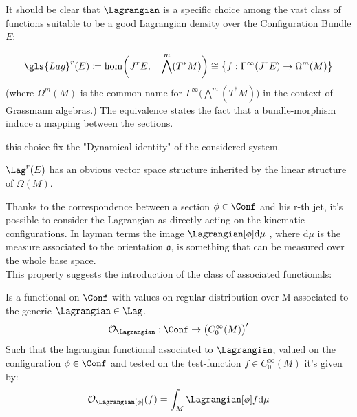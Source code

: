 \documentclass[Main]{subfiles}
\begin{document}
	It should be clear that $\Lagrangian$ is a specific choice among the vast class of functions suitable to be a good Lagrangian density over the  Configuration Bundle $E$:
	\begin{definition}
		\begin{displaymath}
			\gls{Lag}^r (E) \coloneqq \hom\biggr(J^r E,\quad \bigwedge^m( T^*M)\biggr)  \cong \big\{f:\Gamma^\infty(J^r E) \rightarrow \Omega^m(M)  \big\}
		\end{displaymath}
	(where $\Omega^m(M)$ is the common name for $\Gamma^\infty \big( \bigwedge^m( T^*M) \big)$ in the context of Grassmann algebras.)
	The equivalence states the fact that a bundle-morphism induce a mapping between the sections.
	\end{definition}
	 this choice fix the "Dynamical identity" of the considered system.
	\begin{proposition}
		$\Lag^r(E)$ has an obvious vector space structure inherited by the linear structure of $\Omega(M)$.
	\end{proposition}
	
	
	Thanks to the correspondence between a section $\phi \in \Conf$ and his r-th jet, it's possible to consider the Lagrangian as directly acting on the kinematic configurations.
	In layman terms the image  $\Lagrangian [ \phi ] \textrm{d}\mu$ , where $\textrm{d}\mu$ is the measure associated to the orientation $\mathfrak{o}$, is something that can be measured over the whole base space. 
	\\
	This property suggests the introduction of the class of associated functionals:
	\begin{definition}
		Is a functional on $\Conf$ with values on regular distribution over M associated to the generic $\Lagrangian \in \Lag$.	
		\begin{displaymath}
			\mathcal{O}_\Lagrangian : \Conf \rightarrow \big( C^\infty_0(M) \big)'
		\end{displaymath}			
			Such that the lagrangian functional associated to $\Lagrangian$, valued on the configuration $\phi \in \Conf$ and tested on the test-function $f \in C^\infty_0(M)$ it's given by:
		\begin{displaymath}
			\mathcal{O}_\Lagrangian [\phi] (f) = \int_M \Lagrangian [\phi] f \textrm{d}\mu
		\end{displaymath}		
	\end{definition}	
	
\end{document}
